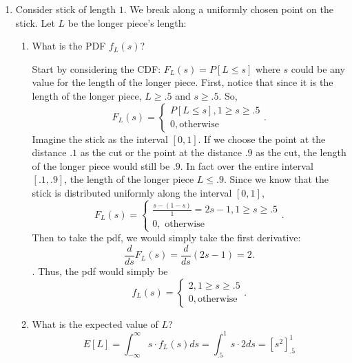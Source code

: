 \documentclass[a4paper]{article}
\begin{document}
\begin{enumerate}
\begin{enumerate}
      \end{enumerate}
   \item Consider stick of length $1$. We break along a uniformly chosen point on the stick. Let $L$ be the longer 
          piece's length:
          \begin{enumerate}
            \item What is the PDF $f_L(s)$?
              \begin{note}
                Start by considering the CDF: $F_L(s) = P[L \leq s]$ where $s$ could be any value for the
                length of the longer piece. First, notice that since it is the length of the longer piece,
                $L \geq .5$ and $s \geq .5$. So,
                \[
                F_L(s) = \begin{cases}
                  P[L \leq s], 1 \geq s \geq .5 \\
                  0, \text{otherwise}
                \end{cases}
                .\] 
                Imagine the stick as the interval $[0,1]$. If we choose the point at the distance $.1$ as the cut or 
                the point at the distance $.9$ as the cut, the length of the longer piece would still be $.9$. In 
                fact over the entire interval $[.1,.9]$, the length of the longer piece $L \leq .9$. Since we
                know that the stick is distributed uniformly along the interval $[0,1]$,
                \[
                F_L(s) = \begin{cases}
                  \frac{s - (1-s)}{1} = 2s - 1, 1 \geq s \geq .5 \\
                  0, \text{ otherwise}
                \end{cases} 
                .\]
                Then to take the pdf, we would simply take the first derivative:
                \[
                \frac{d}{ds} F_L(s) = \frac{d}{ds}( 2s - 1) = 2
                .\]. 
                Thus, the pdf would simply be 
                \[
                f_L(s) = \begin{cases}
                  2, 1 \geq s \geq .5 \\
                  0, \text{otherwise}
                \end{cases}
                .\] 
              \end{note}
             \item What is the expected value of $L$?
                \[
                  E[L] = \int_{-\infty}^{\infty} s \cdot f_L(s) ds =  \int_{.5}^{1} s \cdot 2 ds = [s^2]_{.5}^1  
\]
\end{enumerate}
\end{enumerate}
\end{document}
